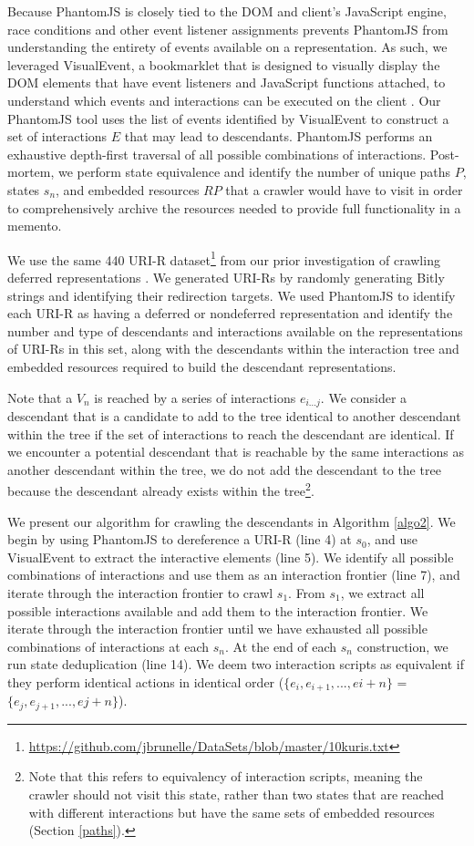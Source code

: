 \documentclass{sig-alternate}
\begin{document}
Because PhantomJS is closely tied to the DOM and client's JavaScript engine, race conditions and other event listener assignments prevents PhantomJS from understanding the entirety of events available on a representation. As such, we leveraged VisualEvent, a bookmarklet that is designed to visually display the DOM elements that have event listeners and JavaScript functions attached, to understand which events and interactions can be executed on the client \cite{seleniumpjs}. 
Our PhantomJS tool uses the list of events identified by VisualEvent to construct a set of interactions $E$ that may lead to descendants. PhantomJS performs an exhaustive depth-first traversal of all possible combinations of interactions. Post-mortem, we perform state equivalence and identify the number of unique paths $P$, states $s_n$, and embedded resources $RP$ that a crawler would have to visit in order to comprehensively archive the resources needed to provide full functionality in a memento.

We use the same 440 URI-R dataset\footnote{\url{https://github.com/jbrunelle/DataSets/blob/master/10kuris.txt}} from our prior investigation of crawling deferred representations \cite{crawlingDeferred}. We generated URI-Rs by randomly generating Bitly strings and identifying their redirection targets. We used PhantomJS to identify each URI-R as having a deferred or nondeferred representation and identify the number and type of descendants and interactions available on the representations of URI-Rs in this set, along with the descendants within the interaction tree and embedded resources required to build the descendant representations. 

Note that a $V_n$ is reached by a series of interactions $e_{i...j}$. We consider a descendant that is a candidate to add to the tree identical to another descendant within the tree if the set of interactions to reach the descendant are identical. If we encounter a potential descendant that is reachable by the same interactions as another descendant within the tree, we do not add the descendant to the tree because the descendant already exists within the tree\footnote{Note that this refers to equivalency of interaction scripts, meaning the crawler should not visit this state, rather than two states that are reached with different interactions but have the same sets of embedded resources (Section \ref{paths}).}.

We present our algorithm for crawling the descendants in Algorithm \ref{algo2}. We begin by using PhantomJS to dereference a URI-R (line 4) at $s_0$, and use VisualEvent to extract the interactive elements (line 5). We identify all possible combinations of interactions and use them as an interaction frontier (line 7), and iterate through the interaction frontier to crawl $s_1$. From $s_1$, we extract all possible interactions available and add them to the interaction frontier. We iterate through the interaction frontier until we have exhausted all possible combinations of interactions at each $s_n$. At the end of each $s_n$ construction, we run state deduplication (line 14). We deem two interaction scripts as equivalent if they perform identical actions in identical order ($\{e_{i}, e_{i+1}, ..., e{i+n}\}$ = $\{e_{j}, e_{j+1}, ..., e{j+n}\}$). 
\end{document}
